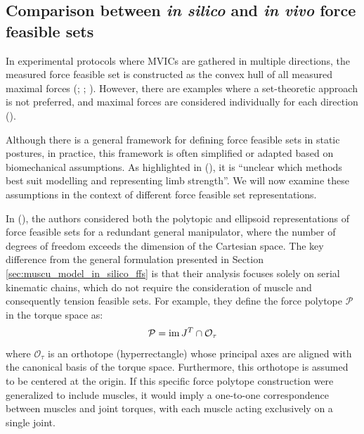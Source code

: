 \subsection{Comparison between \emph{in silico} and \emph{in vivo} force feasible sets}
\label{subsec:force_measurements_vs_ffs}
In experimental protocols where MVICs are gathered in multiple directions, the measured force feasible set is constructed as the convex hull of all measured maximal forces (\cite{oshimaRoboticAnalysesOutput2000}; \cite{rezzougUpperLimbIsometricForce2021b}; \cite{hernandezIsometricForceCapabilities2015}). However, there are examples where a set-theoretic approach is not preferred, and maximal forces are considered individually for each direction (\cite{sasakiHigherDimensionalSpatial2010a}).

Although there is a general framework for defining force feasible sets in static postures, in practice, this framework is often simplified or adapted based on biomechanical assumptions. As highlighted in (\cite{sutjiptoComparisonStrengthProfile2024a}), it is ``unclear which methods best suit modelling and representing limb strength''. We will now examine these assumptions in the context of different force feasible set representations.

In (\cite{chiacchioForcePolytopeForce1997}), the authors considered both the polytopic and ellipsoid representations of force feasible sets for a redundant general manipulator, where the number of degrees of freedom exceeds the dimension of the Cartesian space. The key difference from the general formulation presented in Section \ref{sec:muscu_model_in_silico_ffs} is that their analysis focuses solely on serial kinematic chains, which do not require the consideration of muscle and consequently tension feasible sets. For example, they define the force polytope $\mathcal{P}$ in the torque space as:
\begin{align*}
    \mathcal{P} = \operatorname{im}{J^T} \cap \mathcal{O}_{\tau}
\end{align*}
where $\mathcal{O}_{\tau}$ is an orthotope (hyperrectangle) whose principal axes are aligned with the canonical basis of the torque space. Furthermore, this orthotope is assumed to be centered at the origin. If this specific force polytope construction were generalized to include muscles, it would imply a one-to-one correspondence between muscles and joint torques, with each muscle acting exclusively on a single joint.

